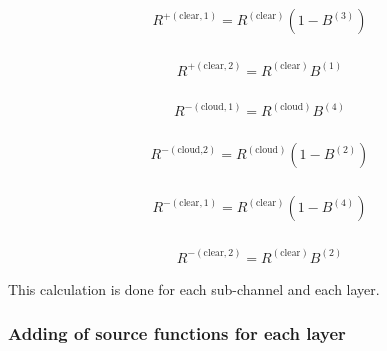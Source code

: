 \begin{equation}
\begin{array}{l}
R^{+(\text {clear}, 1)}=R^{(\text {clear})}\left(1-B^{(3)}\right) \\
\end{array}
\end{equation}

\begin{equation}
\begin{array}{l}
R^{+(\text {clear}, 2)}=R^{(\text {clear})} B^{(1)} \\
\end{array}
\end{equation}

\begin{equation}
\begin{array}{l}
R^{-(\text {cloud}, 1)}=R^{(\text {cloud})} B^{(4)} \\
\end{array}
\end{equation}

\begin{equation}
\begin{array}{l}
R^{-(\text {cloud,2})}=R^{(\text {cloud})}\left(1-B^{(2)}\right) \\
\end{array}
\end{equation}

\begin{equation}
\begin{array}{l}
R^{-(\text {clear}, 1)}=R^{(\text {clear})}\left(1-B^{(4)}\right) \\
\end{array}
\end{equation}

\begin{equation}
\begin{array}{l}
R^{-(\text {clear}, 2)}=R^{(\text {clear})} B^{(2)}
\end{array}
\end{equation}

This calculation is done for each sub-channel and each layer.

\hypertarget{adding-of-source-functions-for-each-layer}{%
\subsubsection{Adding of source functions for each
layer}\label{adding-of-source-functions-for-each-layer}}

